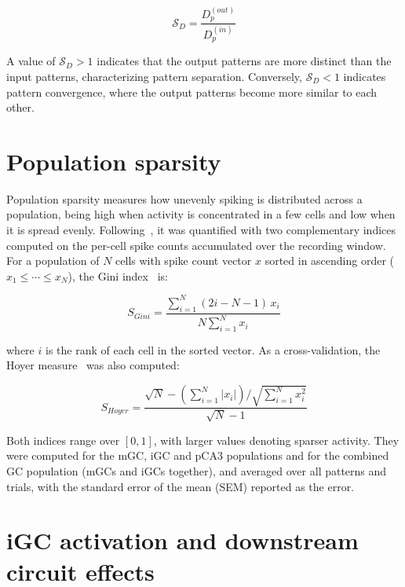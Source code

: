 \begin{equation}
    \label{eq:sd}
    \mathcal{S}_D = \frac{D_p^{(out)}}{D_p^{(in)}}
\end{equation}

A value of $\mathcal{S}_D > 1$ indicates that the output patterns are more distinct than the input patterns, characterizing
pattern separation. Conversely, $\mathcal{S}_D < 1$ indicates pattern convergence, where the output patterns become more
similar to each other.

\section{Population sparsity}\label{sec:population_sparsity}

Population sparsity measures how unevenly spiking is distributed across a population, being high when activity is concentrated in
a few cells and low when it is spread evenly. Following~\textcite{mchughAdultborn2022}, it was quantified with two complementary
indices computed on the per-cell spike counts accumulated over the recording window. For a population of $N$ cells with spike
count vector $x$ sorted in ascending order ($x_1 \leq \cdots \leq x_N$), the Gini index~\parencite{giniMeasurement1921} is:

\begin{equation}
    \label{eq:gini}
    S_{Gini} = \frac{\sum_{i=1}^{N} (2i - N - 1)\, x_i}{N \sum_{i=1}^{N} x_i}
\end{equation}

where $i$ is the rank of each cell in the sorted vector. As a cross-validation, the Hoyer
measure~\parencite{hoyerNonnegative2004} was also computed:

\begin{equation}
    \label{eq:hoyer}
    S_{Hoyer} = \frac{\sqrt{N} - \left(\sum_{i=1}^{N} |x_i|\right) \big/ \sqrt{\sum_{i=1}^{N} x_i^2}}{\sqrt{N} - 1}
\end{equation}

Both indices range over $[0, 1]$, with larger values denoting sparser activity. They were computed for the mGC, iGC and pCA3
populations and for the combined GC population (mGCs and iGCs together), and averaged over all patterns and trials, with
the standard error of the mean (SEM) reported as the error.

\section{iGC activation and downstream circuit effects}\label{sec:igc_activation}

